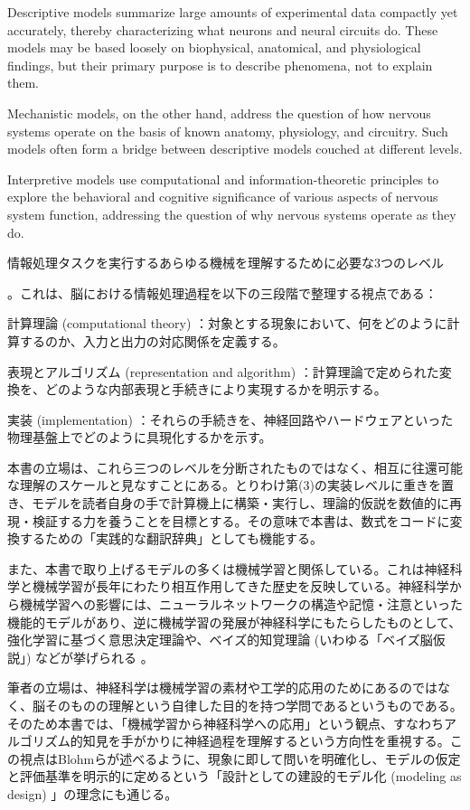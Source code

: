 \documentclass[titlepage]{ltjsbook}
\begin{document}
Descriptive models summarize large amounts of experimental data compactly yet accurately, thereby characterizing what neurons and neural circuits do. These models may be based loosely on biophysical, anatomical, and physiological findings, but their primary purpose is to describe phenomena, not to explain them. 

Mechanistic models, on the other hand, address the question of how nervous systems operate on the basis of known anatomy, physiology, and circuitry. Such models often form a bridge between descriptive models couched at different levels. 

Interpretive models use computational and information-theoretic principles to explore the behavioral and cognitive significance of various aspects of nervous system function, addressing the question of why nervous systems operate as they do.

情報処理タスクを実行するあらゆる機械を理解するために必要な3つのレベル


。これは、脳における情報処理過程を以下の三段階で整理する視点である：

計算理論 (computational theory) ：対象とする現象において、何をどのように計算するのか、入力と出力の対応関係を定義する。

表現とアルゴリズム (representation and algorithm) ：計算理論で定められた変換を、どのような内部表現と手続きにより実現するかを明示する。

実装 (implementation) ：それらの手続きを、神経回路やハードウェアといった物理基盤上でどのように具現化するかを示す。

本書の立場は、これら三つのレベルを分断されたものではなく、相互に往還可能な理解のスケールと見なすことにある。とりわけ第(3)の実装レベルに重きを置き、モデルを読者自身の手で計算機上に構築・実行し、理論的仮説を数値的に再現・検証する力を養うことを目標とする。その意味で本書は、数式をコードに変換するための「実践的な翻訳辞典」としても機能する。

また、本書で取り上げるモデルの多くは機械学習と関係している。これは神経科学と機械学習が長年にわたり相互作用してきた歴史を反映している。神経科学から機械学習への影響には、ニューラルネットワークの構造や記憶・注意といった機能的モデルがあり、逆に機械学習の発展が神経科学にもたらしたものとして、強化学習に基づく意思決定理論や、ベイズ的知覚理論 (いわゆる「ベイズ脳仮説」) などが挙げられる \citep{Hassabis2017-zm}。

筆者の立場は、神経科学は機械学習の素材や工学的応用のためにあるのではなく、脳そのものの理解という自律した目的を持つ学問であるというものである。そのため本書では、「機械学習から神経科学への応用」という観点、すなわちアルゴリズム的知見を手がかりに神経過程を理解するという方向性を重視する。この視点はBlohmらが述べるように、現象に即して問いを明確化し、モデルの仮定と評価基準を明示的に定めるという「設計としての建設的モデル化 (modeling as design) 」の理念にも通じる。
\end{document}
